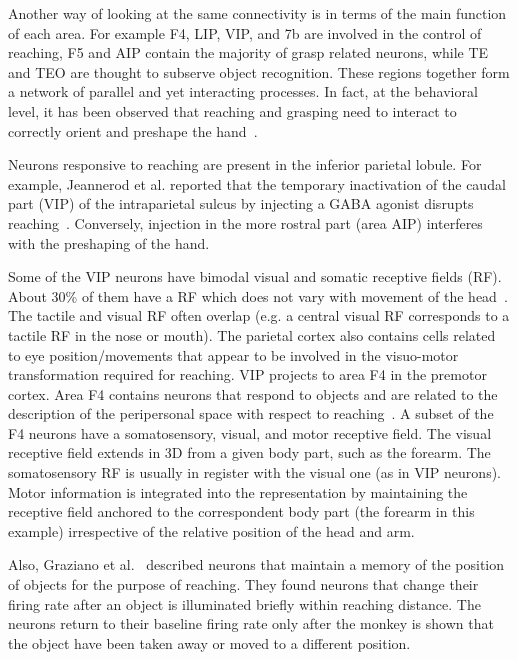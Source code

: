 Another way of looking at the same connectivity is in terms of the main 
function of each area. For example F4, LIP, VIP, and 7b are involved in the control of 
reaching, F5 and AIP contain the majority of grasp related neurons, 
while TE and TEO are thought to subserve object recognition. These regions together form a network 
of parallel and yet interacting processes. In fact, at the behavioral level, it has 
been observed that reaching and 
grasping need to interact to correctly orient and preshape the hand~\cite{jeannerod-arbib-rizzolatti-sakata-1995}.

Neurons responsive to reaching are present in the inferior parietal lobule. For 
example, Jeannerod et al. reported 
that the temporary inactivation of the caudal part (VIP) of the intraparietal sulcus by injecting a GABA 
agonist
disrupts reaching~\cite{jeannerod-arbib-rizzolatti-sakata-1995}. Conversely, injection in the more rostral part (area AIP) 
interferes with the
preshaping of the hand. 

Some of the VIP neurons have bimodal visual and somatic receptive 
fields (RF). About 30\% of them have a RF which does not vary with 
movement of the head~\cite{rizzolatti-fogassi-gallese-1997}. The tactile and 
visual RF often overlap (e.g. a central visual 
RF corresponds to a tactile RF in the nose or mouth). The parietal cortex also contains 
cells related to eye position/movements that appear to be involved in  
the visuo-motor transformation required for reaching. VIP projects to area 
F4 in the premotor cortex. Area F4 contains neurons that respond to objects and 
are related to the description of the peripersonal space with respect to reaching~\cite{graziano-hu-gross-1997,fogassi96coding}. A subset of the F4 neurons 
have a somatosensory, visual, and motor receptive field. The visual receptive 
field extends in 3D from a given body part, such as the forearm. The somatosensory RF
is usually in register with the visual one (as in VIP neurons). Motor information
is integrated into the representation by maintaining the receptive
field anchored to the correspondent body part (the forearm in this
example) irrespective of the relative position of the head and arm.

Also, Graziano et al.~\cite{graziano-cooke-taylor-2000} described neurons that maintain a 
memory of the position of objects for the purpose of reaching. They found neurons 
that change their firing rate after an object is illuminated briefly
within reaching distance. The neurons return 
to their baseline firing rate only after the monkey is shown that the object have been 
taken away or moved to a different position.

